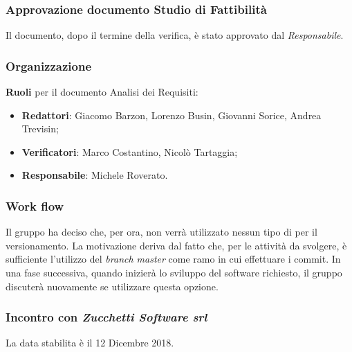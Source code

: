 \subsubsection{Approvazione documento Studio di Fattibilità}
Il documento, dopo il termine della verifica, è stato approvato dal \emph{Responsabile}.

\newpage

\subsubsection{Organizzazione}
\textbf{Ruoli} per il documento Analisi dei Requisiti:
\begin{itemize}
\item{\textbf{Redattori}: Giacomo Barzon, Lorenzo Busin, Giovanni Sorice, Andrea Trevisin;}
\item{\textbf{Verificatori}: Marco Costantino, Nicolò Tartaggia;}
\item{\textbf{Responsabile}: Michele Roverato.}
\end{itemize}

\subsubsection{Work flow}
Il gruppo ha deciso che, per ora, non verrà utilizzato nessun tipo di  per il versionamento. La motivazione deriva dal fatto che, per le attività da svolgere, è sufficiente l'utilizzo del \emph{branch master} come ramo in cui effettuare i commit. In una fase successiva, quando inizierà lo sviluppo del software richiesto, il gruppo discuterà nuovamente se utilizzare questa opzione.

\subsubsection{Incontro con \emph{Zucchetti Software srl}}
La data stabilita è il 12 Dicembre 2018.